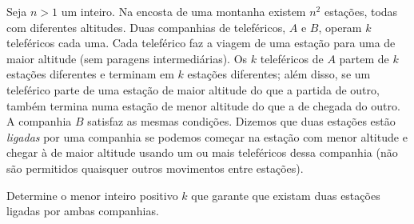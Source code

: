 Seja $n > 1$ um inteiro.
Na encosta de uma montanha existem $n^2$ estações, todas com diferentes altitudes.
Duas companhias de teleféricos, $A$ e $B$, operam $k$ teleféricos cada uma.
Cada teleférico faz a viagem de uma estação para uma de maior altitude (sem paragens intermediárias).
Os $k$ teleféricos de $A$ partem de $k$ estações diferentes e terminam em $k$ estações diferentes;
além disso, se um teleférico parte de uma estação de maior altitude do que a partida de outro, também termina numa estação de menor altitude do que a de chegada do outro.
A companhia $B$ satisfaz as mesmas condições.
Dizemos que duas estações estão \emph{ligadas} por uma companhia se podemos começar na estação com menor altitude e chegar à de maior altitude usando um ou mais teleféricos dessa companhia (não são permitidos quaisquer outros movimentos entre estações).

Determine o menor inteiro positivo $k$ que garante que existam duas estações ligadas por ambas companhias.
